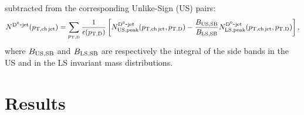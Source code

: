 \documentclass[a4paper]{jpconf}
\begin{document}
\begin{description}
subtracted from the corresponding Unlike-Sign (US) pairs:
\begin{equation*}
N^{\rm \mathrm{D^{0}}\hbox{-}jet}(p_{\mathrm{T,ch\, jet}})=\sum_{p_{\mathrm{T,D}}} \frac{1}{\epsilon(p_{\mathrm{T,D}})} 
\left[N_{\rm US, peak}^{\rm \mathrm{D^{0}}\hbox{-}jet}(p_{\mathrm{T,ch\, jet}},p_{\mathrm{T,D}}) - 
\frac{B_{\rm US, SB}}{B_{\rm LS, SB}} 
N_{\rm LS, peak}^{\rm \mathrm{D^{0}}\hbox{-}jet}(p_{\mathrm{T,ch\, jet}},p_{\mathrm{T,D}})\right],
\end{equation*}
where $B_{\rm US, SB}$ and $B_{\rm LS, SB}$ are respectively the integral of
the side bands in the US and in the LS invariant mass distributions.
\end{description}

\section{Results}
\end{document}
